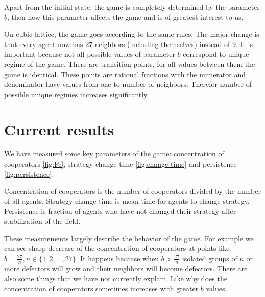 \documentclass[a4paper,12pt]{article}
\begin{document}
Apart from the initial state, the game is completely determined by the parameter $b$, then how this parameter affects the game and is of greatest interest to us.

On cubic lattice, the game goes according to the same rules. The major change is that every agent now has 27 neighbors (including themselves) instead of 9. It is important because not all possible values of parameter $b$ correspond to unique regime of the game. There are transition points, for all values between them the game is identical. These points are rational fractions with the numerator and denominator have values from one to number of neighbors. Therefor number of possible unique regimes increases significantly.

\section{Current results}

We have measured some key parameters of the game: concentration of cooperators \ref{fig:Fc}, strategy change time \ref{fig:change time} and persistence \ref{fig:persistence}.

Concentration of cooperators is the number of cooperators divided by the number of all agents. Strategy change time is mean time for agents to change strategy. Persistence is fraction of agents who have not changed their strategy after stabilization of the field.


These measurements  largely describe the behavior of the game. For example we can see sharp decrease of the concentration of cooperators at points like $b = \frac{27}{n}, n\in\{1, 2, \ldots, 27\} $. It happens because when $b > \frac{27}{n}$ isolated groups of $n$ or more defectors will grow and their neighbors will become defectors. There are also some things that we have not currently explain. Like why does the concentration of cooperators sometimes increases with greater $b$ values. 
\end{document}
